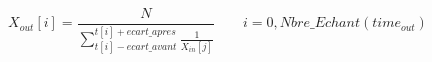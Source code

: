 \[
X_{out}[i] = \frac {N}{\displaystyle{\sum_{t[i] - ecart\_avant}^{t[i] + ecart\_apres} \frac{1}{X_{in}[j]} } }
\qquad i=0,Nbre\_Echant(time_{out})
\]

